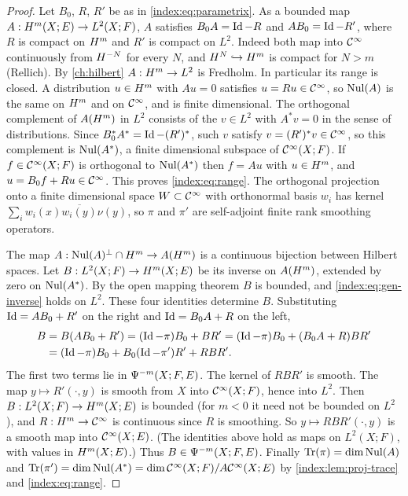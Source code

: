 \begin{proof}
  Let $B_0$, $R$, $R'$ be as in \eqref{index:eq:parametrix}. As a bounded map
  $A:H^{m}(X;E)\to L^2(X;F)$, $A$ satisfies $B_0A=\operatorname{Id}-R$ and $AB_0=\operatorname{Id}-R'$,
  where $R$ is compact on $H^{m}$ and $R'$ is compact on $L^2$. Indeed both
  map into $\mathcal{C}^\infty$ continuously from $H^{-N}$ for every $N$, and
  $H^{N}\hookrightarrow H^{m}$ is compact for $N>m$ (Rellich). By
  \cref{ch:hilbert} $A:H^{m}\to L^2$ is Fredholm. In particular its range is
  closed. A distribution $u\in H^{m}$ with $Au=0$ satisfies $u=Ru\in\mathcal{C}^\infty$, so
  $\operatorname{Nul}(A)$ is the same on $H^{m}$ and on $\mathcal{C}^\infty$, and is finite
  dimensional. The orthogonal complement of $A(H^{m})$ in $L^2$ consists of
  the $v\in L^2$ with $A^*v=0$ in the sense of distributions. Since
  $B_0^*A^*=\operatorname{Id}-(R')^*$, such $v$ satisfy $v=(R')^*v\in\mathcal{C}^\infty$, so this
  complement is $\operatorname{Nul}(A^*)$, a finite dimensional subspace of $\mathcal{C}^\infty(X;F)$. If
  $f\in\mathcal{C}^\infty(X;F)$ is orthogonal to $\operatorname{Nul}(A^*)$ then $f=Au$ with $u\in H^{m}$,
  and $u=B_0f+Ru\in\mathcal{C}^\infty$. This proves \eqref{index:eq:range}. The orthogonal
  projection onto a finite dimensional space $W\subset\mathcal{C}^\infty$ with orthonormal
  basis $w_i$ has kernel $\sum_iw_i(x)\overline{w_i(y)}\nu(y)$, so $\pi$ and
  $\pi'$ are self-adjoint finite rank smoothing operators.

  The map $A:\operatorname{Nul}(A)^\perp\cap H^{m}\to A(H^{m})$ is a continuous bijection
  between Hilbert spaces. Let $B:L^2(X;F)\to H^{m}(X;E)$ be its inverse on
  $A(H^{m})$, extended by zero on $\operatorname{Nul}(A^*)$. By the open mapping theorem $B$
  is bounded, and \eqref{index:eq:gen-inverse} holds on $L^2$. These four
  identities determine $B$. Substituting
  $\operatorname{Id}=AB_0+R'$ on the right and $\operatorname{Id}=B_0A+R$ on the left,
  \begin{align*}
    B&=B(AB_0+R')=(\operatorname{Id}-\pi)B_0+BR'
     =(\operatorname{Id}-\pi)B_0+(B_0A+R)BR'\\
     &=(\operatorname{Id}-\pi)B_0+B_0(\operatorname{Id}-\pi')R'+RBR'.
  \end{align*}
  The first two terms lie in $\Psi^{-m}(X;F,E)$. The kernel of $RBR'$ is
  smooth. The map $y\mapsto R'(\cdot,y)$ is smooth from $X$ into $\mathcal{C}^\infty(X;F)$,
  hence into $L^2$. Then $B:L^2(X;F)\to H^{m}(X;E)$ is bounded (for $m<0$ it
  need not be bounded on $L^2$), and $R:H^{m}\to\mathcal{C}^\infty$ is continuous since
  $R$ is smoothing. So $y\mapsto RBR'(\cdot,y)$ is a smooth map into
  $\mathcal{C}^\infty(X;E)$. (The identities above hold as maps on $L^2(X;F)$, with values
  in $H^{m}(X;E)$.)
  Thus $B\in\Psi^{-m}(X;F,E)$. Finally $\operatorname{Tr}(\pi)=\dim\operatorname{Nul}(A)$ and
  $\operatorname{Tr}(\pi')=\dim\operatorname{Nul}(A^*)=\dim\mathcal{C}^\infty(X;F)/A\mathcal{C}^\infty(X;E)$ by
  \cref{index:lem:proj-trace} and \eqref{index:eq:range}.
\end{proof}

